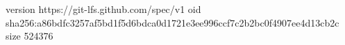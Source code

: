 version https://git-lfs.github.com/spec/v1
oid sha256:a86bdfc3257af5bd1f5d6bdca0d1721e3ee996ccf7c2b2bc0f4907ee4d13cb2c
size 524376
